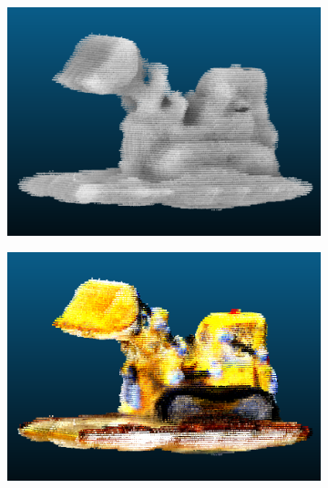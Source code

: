 \documentclass{article}
\begin{document}
\begin{figure}[!h]
 \centering
\begin{subfigure}{.25\textwidth}
  \centering
  \includegraphics[width=\linewidth]{figs/lego_pc_no.png}  
\end{subfigure}
\begin{subfigure}{.25\textwidth}
  \centering
  \includegraphics[width=\linewidth]{figs/lego_pc.png}  
\end{subfigure}
\begin{subfigure}{.21\textwidth}
  \centering

\end{subfigure}
\end{figure}
\end{document}
